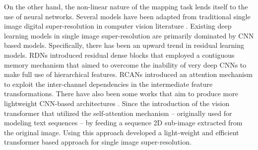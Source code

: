 On the other hand, the non-linear nature of the mapping task lends itself to the use of neural networks. Several models have been adapted from traditional single image digital super-resolution in computer vision literature \cite{sdraka2022DL4downscalingRemoteSensing}. Existing deep learning models in single image super-resolution are primarily dominated by \ac{CNN} based models. Specifically, there has been an upward trend in residual learning models. \acp{RDN} \cite{Zhang2018ResidualDenseSuperResolution} introduced residual dense blocks that employed a contiguous memory mechanism that aimed to overcome the inability of very deep \acp{CNN} to make full use of hierarchical features. 
\acp{RCAN} \cite{Zhang2018RCANSuperResolution} introduced an attention mechanism to exploit the inter-channel dependencies in the intermediate feature transformations. There have also been some works that aim to produce more lightweight \ac{CNN}-based architectures \cite{Zheng2019IMDN,Xiaotong2020LatticeNET}. Since the introduction of the vision transformer \cite{Vaswani2017Attention} that utilized the self-attention mechanism -- originally used for modeling text sequences -- by feeding a sequence 2D sub-image extracted from the original image. Using this approach \cite{LuESRT2022} developed a light-weight and efficient transformer based approach for single image super-resolution. 


